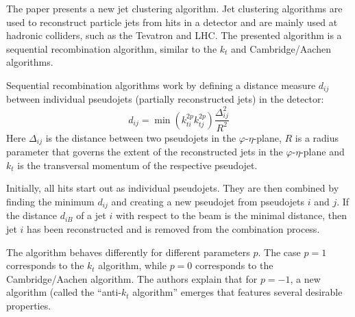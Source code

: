 

\captionsetup{width=0.45\textwidth}




\noindent
The paper\cite{antikt} presents a new jet clustering algorithm.
Jet clustering algorithms are used to reconstruct particle jets from hits in a detector and are mainly used at hadronic colliders, such as the Tevatron and LHC.
The presented algorithm is a sequential recombination algorithm, similar to the $k_t$ and Cambridge/Aachen algorithms.

Sequential recombination algorithms work by defining a distance measure $d_{ij}$ between individual pseudojets (partially reconstructed jets) in the detector:
\begin{equation}
  d_{ij} = \min\left(k_{ti}^{2p} k_{tj}^{2p}\right) \frac{Δ_{ij}^2}{R^2}
\end{equation}
Here $Δ_{ij}$ is the distance between two pseudojets in the $φ$-$η$-plane, $R$ is a radius parameter that governs the extent of the reconstructed jets in the $φ$-$η$-plane and $k_t$ is the transversal momentum of the respective pseudojet.

Initially, all hits start out as individual pseudojets.
They are then combined by finding the minimum $d_{ij}$ and creating a new pseudojet from pseudojets $i$ and $j$.
If the distance $d_{iB}$ of a jet $i$ with respect to the beam is the minimal distance, then jet $i$ has been reconstructed and is removed from the combination process.

The algorithm behaves differently for different parameters $p$.
The case $p=1$ corresponds to the $k_t$ algorithm, while $p=0$ corresponds to the Cambridge/Aachen algorithm.
The authors explain that for $p=-1$, a new algorithm (called the \enquote{anti-$k_t$ algorithm} emerges that features several desirable properties.

